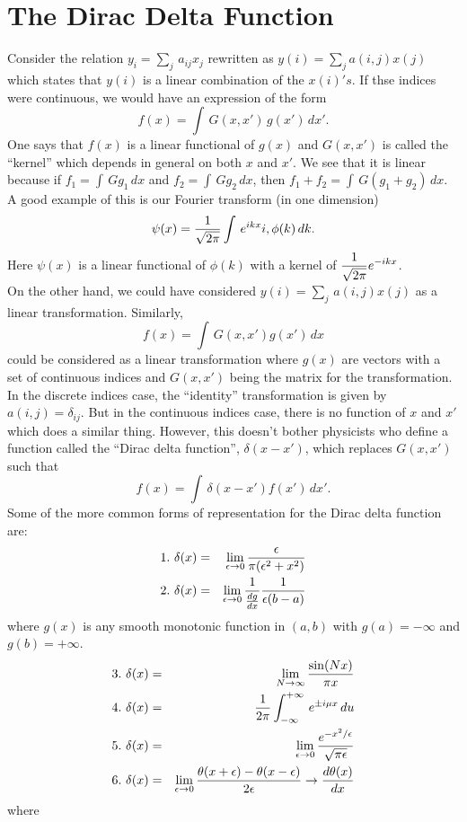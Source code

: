 \section{The Dirac Delta Function}
Consider the relation $\displaystyle y_i = \sum_j \, a_{ij} x_j$ rewritten as $\displaystyle y(i) = \sum_j a(i,j) x(j)$ which states that $y(i)$ is a linear combination of the $x(i)'s$.
If thse indices were continuous, we would have an expression of the form
$$f(x) = \int\, G(x,x') \, g(x') \, dx'.$$ One says that $f(x)$ is a linear functional of $g(x)$ and $G(x,x')$ is called the ``kernel'' which depends in general on both $x$ and $x'$. We see that it is linear
because if $f_1 = \int\, G g_1\,dx$ and $f_2 = \int\, G g_2\,dx$, then $f_1 + f_2 = \int\, G(g_1 + g_2)\, dx$. A good example of this is our Fourier transform (in one dimension)
$$\psi(x) = {1\over \sqrt{2\pi}}\int\, e^{ikx}i, \phi(k)\, dk.$$ Here $\psi(x)$ is a linear functional of $\phi(k)$ with a kernel of $\displaystyle {1\over\sqrt{2\pi}}e^{-ikx}$. \\
On the other hand, we could have considered $\displaystyle y(i) = \sum_j\, a(i,j) x(j)$ as a linear transformation. Similarly, 
$$f(x) = \int\, G(x,x') g(x')\,dx$$ could be considered as a linear transformation where $g(x)$ are vectors with a set of continuous indices and $G(x,x')$ being the matrix for the transformation.\\
In the discrete indices case, the ``identity'' transformation is given by $a(i,j) = \delta_{ij}$. But in the continuous indices case, there is no function of $x$ and $x'$ which does a similar thing. However, 
this doesn't bother physicists who define a function called the ``Dirac delta function'', $\delta(x-x')$, which replaces $G(x,x')$ such that $$f(x) = \int \, \delta(x-x') f(x')\, dx'.$$ Some of the more common forms 
of representation for the Dirac delta function are:
\begin{eqnarray*}
1.\ \delta(x) &=& \lim_{\epsilon\rightarrow 0} {\epsilon\over \pi (\epsilon^2 + x^2)}\\
2.\ \delta(x) &=& \lim_{\epsilon\rightarrow 0} {1\over {dg\over dx} } {1\over \epsilon(b-a)}
\end{eqnarray*}where $g(x)$ is any smooth monotonic function in $(a,b)$ with $g(a) = -\infty$ and $g(b) = +\infty$. 
\begin{eqnarray*}
3.\ \delta(x) &=& \lim_{N\rightarrow \infty} {\sin(Nx)\over \pi x}\\
4.\ \delta(x) &=& {1\over 2\pi} \int_{-\infty}^{+\infty} \, e^{\pm i\mu x}\, du\\
5.\ \delta(x) &=& \lim_{\epsilon\rightarrow 0} {e^{-x^2/\epsilon}\over \sqrt{\pi\epsilon}}\\
6.\ \delta(x) &=& \lim_{\epsilon\rightarrow 0} {\theta(x+\epsilon) - \theta(x-\epsilon)\over 2\epsilon} \rightarrow {d\theta(x)\over dx}\\
\end{eqnarray*}where 
